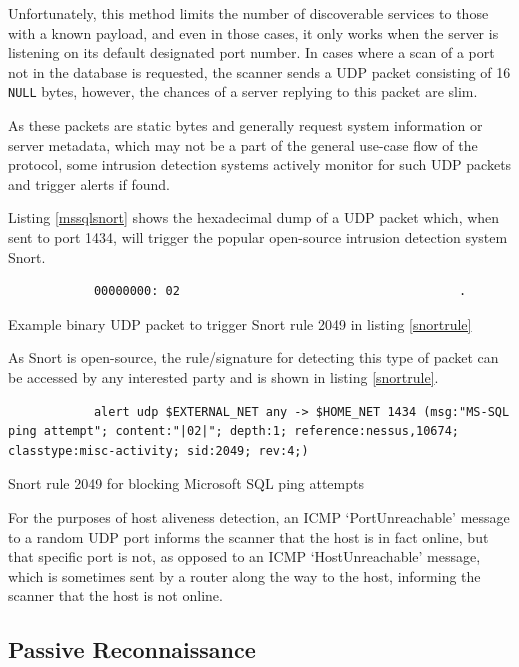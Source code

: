 \documentclass[a4paper,12pt]{article}
\begin{document}
	Unfortunately, this method limits the number of discoverable services to those with a known payload, and even in those cases, it only works when the server is listening on its default designated port number. In cases where a scan of a port not in the database is requested, the scanner sends a UDP packet consisting of 16 \texttt{NULL} bytes, however, the chances of a server replying to this packet are slim.
	
	As these packets are static bytes and generally request system information or server metadata, which may not be a part of the general use-case flow of the protocol, some intrusion detection systems actively monitor for such UDP packets and trigger alerts if found.
	
	Listing \ref{mssqlsnort} shows the hexadecimal dump of a UDP packet which, when sent to port 1434, will trigger the popular open-source intrusion detection system Snort\cite{snort49}.
	
	\begin{listing}[H]
		\begin{verbatim}
			00000000: 02                                       .
		\end{verbatim}
		\caption{Example binary UDP packet to trigger Snort rule 2049 in listing \ref{snortrule}}
		\label{mssqlsnort}
	\end{listing}
	
	As Snort is open-source, the rule/signature for detecting this type of packet can be accessed by any interested party and is shown in listing \ref{snortrule}.
	
	\begin{listing}[H]
		\begin{verbatim}
			alert udp $EXTERNAL_NET any -> $HOME_NET 1434 (msg:"MS-SQL ping attempt"; content:"|02|"; depth:1; reference:nessus,10674; classtype:misc-activity; sid:2049; rev:4;)
		\end{verbatim}
		\caption{Snort rule 2049 for blocking Microsoft SQL ping attempts\cite{snort49}}
		\label{snortrule}
	\end{listing}
	
	For the purposes of host aliveness detection, an ICMP `PortUnreachable' message to a random UDP port informs the scanner that the host is in fact online, but that specific port is not, as opposed to an ICMP `HostUnreachable' message, which is sometimes sent by a router along the way to the host, informing the scanner that the host is not online.

\newpage
\subsection{Passive Reconnaissance} \label{passive}
 
\end{document}
